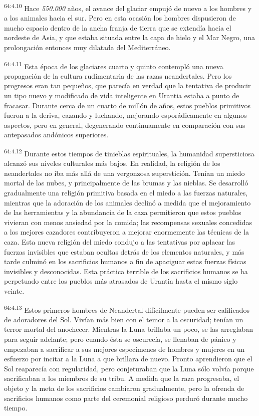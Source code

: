\par
\textsuperscript{64:4.10} Hace \textit{550.000} años, el avance del glaciar empujó de nuevo a los hombres y a los animales hacia el sur. Pero en esta ocasión los hombres dispusieron de mucho espacio dentro de la ancha franja de tierra que se extendía hacia el nordeste de Asia, y que estaba situada entre la capa de hielo y el Mar Negro, una prolongación entonces muy dilatada del Mediterráneo.

\par
\textsuperscript{64:4.11} Esta época de los glaciares cuarto y quinto contempló una nueva propagación de la cultura rudimentaria de las razas neandertales. Pero los progresos eran tan pequeños, que parecía en verdad que la tentativa de producir un tipo nuevo y modificado de vida inteligente en Urantia estaba a punto de fracasar. Durante cerca de un cuarto de millón de años, estos pueblos primitivos fueron a la deriva, cazando y luchando, mejorando esporádicamente en algunos aspectos, pero en general, degenerando continuamente en comparación con sus antepasados andónicos superiores.

\par
\textsuperscript{64:4.12} Durante estos tiempos de tinieblas espirituales, la humanidad supersticiosa alcanzó sus niveles culturales más bajos. En realidad, la religión de los neandertales no iba más allá de una vergonzosa superstición. Tenían un miedo mortal de las nubes, y principalmente de las brumas y las nieblas. Se desarrolló gradualmente una religión primitiva basada en el miedo a las fuerzas naturales, mientras que la adoración de los animales declinó a medida que el mejoramiento de las herramientas y la abundancia de la caza permitieron que estos pueblos vivieran con menos ansiedad por la comida; las recompensas sexuales concedidas a los mejores cazadores contribuyeron a mejorar enormemente las técnicas de la caza. Esta nueva religión del miedo condujo a las tentativas por aplacar las fuerzas invisibles que estaban ocultas detrás de los elementos naturales, y más tarde culminó en los sacrificios humanos a fin de apaciguar estas fuerzas físicas invisibles y desconocidas. Esta práctica terrible de los sacrificios humanos se ha perpetuado entre los pueblos más atrasados de Urantia hasta el mismo siglo veinte.

\par
\textsuperscript{64:4.13} Estos primeros hombres de Neandertal difícilmente pueden ser calificados de adoradores del Sol. Vivían más bien con el temor a la oscuridad; tenían un terror mortal del anochecer. Mientras la Luna brillaba un poco, se las arreglaban para seguir adelante; pero cuando ésta se oscurecía, se llenaban de pánico y empezaban a sacrificar a sus mejores especímenes de hombres y mujeres en un esfuerzo por incitar a la Luna a que brillara de nuevo. Pronto aprendieron que el Sol reaparecía con regularidad, pero conjeturaban que la Luna sólo volvía porque sacrificaban a los miembros de su tribu. A medida que la raza progresaba, el objeto y la meta de los sacrificios cambiaron gradualmente, pero la ofrenda de sacrificios humanos como parte del ceremonial religioso perduró durante mucho tiempo.

